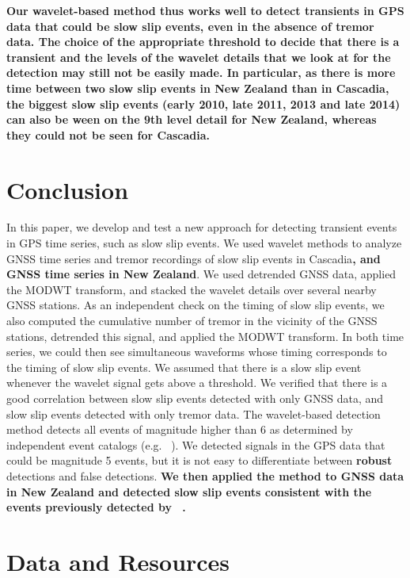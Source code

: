 \documentclass{article}
\begin{document}
\textbf{Our wavelet-based method thus works well to detect transients in GPS data that could be slow slip events, even in the absence of tremor data. The choice of the appropriate threshold to decide that there is a transient and the levels of the wavelet details that we look at for the detection may still not be easily made. In particular, as there is more time between two slow slip events in New Zealand than in Cascadia, the biggest slow slip events (early 2010, late 2011, 2013 and late 2014) can also be ween on the 9th level detail for New Zealand, whereas they could not be seen for Cascadia.} \\

\section{Conclusion}

In this paper, we develop and test a new approach for detecting transient events in GPS time series, such as slow slip events. We used wavelet methods to analyze GNSS time series and tremor recordings of slow slip events in Cascadia\textbf{, and GNSS time series in New Zealand}. We used detrended GNSS data, applied the MODWT transform, and stacked the wavelet details over several nearby GNSS stations. As an independent check on the timing of slow slip events, we also computed the cumulative number of tremor in the vicinity of the GNSS stations, detrended this signal, and applied the MODWT transform. In both time series, we could then see simultaneous waveforms whose timing corresponds to the timing of slow slip events. We assumed that there is a slow slip event whenever the wavelet signal gets above a threshold. We verified that there is a good correlation between slow slip events detected with only GNSS data, and slow slip events detected with only tremor data. The wavelet-based detection method detects all events of magnitude higher than 6 as determined by independent event catalogs (e.g. ~\citep{MIC_2019}). We detected signals in the GPS data that could be magnitude 5 events, but it is not easy to differentiate between \textbf{robust} detections and false detections. \textbf{We then applied the method to GNSS data in New Zealand and detected slow slip events consistent with the events previously detected by ~\citet{TOD_2016}.}

\section*{Data and Resources}
\end{document}
